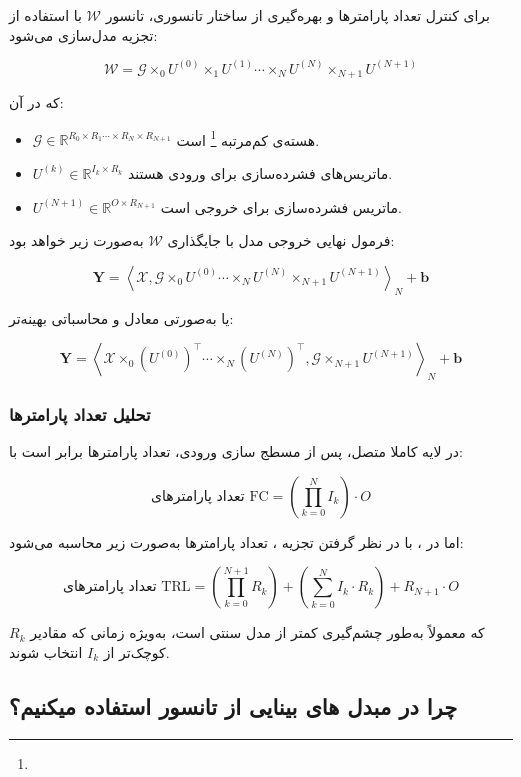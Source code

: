 برای کنترل تعداد پارامترها و بهره‌گیری از ساختار تانسوری، تانسور $\mathcal{W}$ با استفاده از تجزیه  مدل‌سازی می‌شود:

\[
\mathcal{W} = \mathcal{G} \times_0 U^{(0)} \times_1 U^{(1)} \cdots \times_N U^{(N)} \times_{N+1} U^{(N+1)}
\]

که در آن:

\begin{itemize}
	\item $\mathcal{G} \in \mathbb{R}^{R_0 \times R_1 \cdots \times R_N \times R_{N+1}}$ هسته‌ی کم‌مرتبه \footnote{} است.
	\item $U^{(k)} \in \mathbb{R}^{I_k \times R_k}$ ماتریس‌های فشرده‌سازی برای ورودی هستند.
	\item $U^{(N+1)} \in \mathbb{R}^{O \times R_{N+1}}$ ماتریس فشرده‌سازی برای خروجی است.
\end{itemize}

فرمول نهایی خروجی مدل با جایگذاری $\mathcal{W}$ به‌صورت زیر خواهد بود:

\[
\mathbf{Y} = \left\langle \mathcal{X}, \mathcal{G} \times_0 U^{(0)} \cdots \times_N U^{(N)} \times_{N+1} U^{(N+1)} \right\rangle_N + \mathbf{b}
\]

یا به‌صورتی معادل و محاسباتی بهینه‌تر:

\[
\mathbf{Y} = \left\langle \mathcal{X} \times_0 (U^{(0)})^\top \cdots \times_N (U^{(N)})^\top, \mathcal{G} \times_{N+1} U^{(N+1)} \right\rangle_N + \mathbf{b}
\]

\subsubsection*{تحلیل تعداد پارامترها}

در لایه کاملا متصل، پس از مسطج سازی ورودی، تعداد پارامترها برابر است با:

\[
\text{تعداد پارامترهای FC} = \left( \prod_{k=0}^{N} I_k \right) \cdot O
\]

اما در ، با در نظر گرفتن تجزیه ، تعداد پارامترها به‌صورت زیر محاسبه می‌شود:

\[
\text{تعداد پارامترهای TRL} = \left( \prod_{k=0}^{N+1} R_k \right) + \left( \sum_{k=0}^{N} I_k \cdot R_k \right) + R_{N+1} \cdot O
\]

که معمولاً به‌طور چشم‌گیری کمتر از مدل سنتی است، به‌ویژه زمانی که مقادیر $R_k$ کوچک‌تر از $I_k$ انتخاب شوند.

\subsection{چرا در مبدل های بینایی از تانسور استفاده میکنیم؟}




